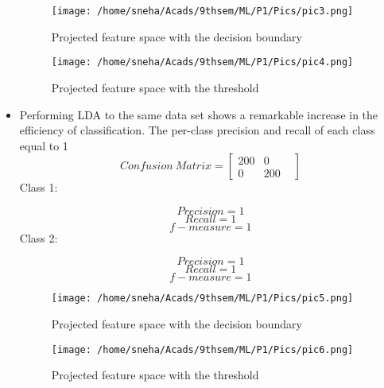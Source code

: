 \documentclass[12pt]{article}
\begin{document}
\begin{itemize}
{\begin{figure}
	\centering
		\texttt{[image: /home/sneha/Acads/9thsem/ML/P1/Pics/pic3.png]}
	\caption{Projected feature space with the decision boundary}
	
\end{figure}

\begin{figure}
	\centering
		\texttt{[image: /home/sneha/Acads/9thsem/ML/P1/Pics/pic4.png]}
	\caption{Projected feature space with the threshold}
	
\end{figure}

}

\item{Performing LDA to the same data set shows a remarkable increase in the efficiency of classification. The per-class precision and recall of each class equal to 1
\begin{equation}
Confusion\ Matrix = \begin{bmatrix}200  & 0 &\\ 0 &200 \end{bmatrix}
\end{equation}
Class 1:

\begin{equation}
Precision = 1
\end{equation}
\begin{equation}
Recall = 1
\end{equation}
\begin{equation}
f-measure = 1
\end{equation}
Class 2:

\begin{equation}
Precision = 1
\end{equation}
\begin{equation}
Recall = 1
\end{equation}
\begin{equation}
f-measure = 1
\end{equation}
\begin{figure}
	\centering
		\texttt{[image: /home/sneha/Acads/9thsem/ML/P1/Pics/pic5.png]}
	\caption{Projected feature space with the decision boundary}
	
\end{figure}

\begin{figure}
	\centering
		\texttt{[image: /home/sneha/Acads/9thsem/ML/P1/Pics/pic6.png]}
	\caption{Projected feature space with the threshold}
	
\end{figure}

}

\end{itemize}
\end{document}
